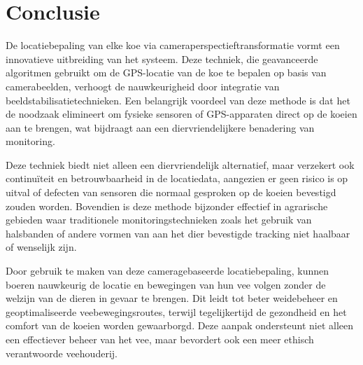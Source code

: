 
\chapter{Conclusie}%
\label{ch:conclusie}


De locatiebepaling van elke koe via cameraperspectieftransformatie vormt een innovatieve uitbreiding van het systeem. Deze techniek, die geavanceerde algoritmen gebruikt om de GPS-locatie van de koe te bepalen op basis van camerabeelden, verhoogt de nauwkeurigheid door integratie van beeldstabilisatietechnieken. Een belangrijk voordeel van deze methode is dat het de noodzaak elimineert om fysieke sensoren of GPS-apparaten direct op de koeien aan te brengen, wat bijdraagt aan een diervriendelijkere benadering van monitoring.

Deze techniek biedt niet alleen een diervriendelijk alternatief, maar verzekert ook continuïteit en betrouwbaarheid in de locatiedata, aangezien er geen risico is op uitval of defecten van sensoren die normaal gesproken op de koeien bevestigd zouden worden. Bovendien is deze methode bijzonder effectief in agrarische gebieden waar traditionele monitoringstechnieken zoals het gebruik van halsbanden of andere vormen van aan het dier bevestigde tracking niet haalbaar of wenselijk zijn.

Door gebruik te maken van deze cameragebaseerde locatiebepaling, kunnen boeren nauwkeurig de locatie en bewegingen van hun vee volgen zonder de welzijn van de dieren in gevaar te brengen. Dit leidt tot beter weidebeheer en geoptimaliseerde veebewegingsroutes, terwijl tegelijkertijd de gezondheid en het comfort van de koeien worden gewaarborgd. Deze aanpak ondersteunt niet alleen een effectiever beheer van het vee, maar bevordert ook een meer ethisch verantwoorde veehouderij.

